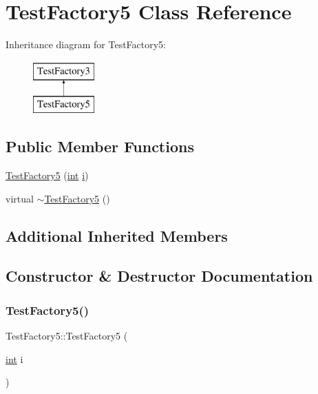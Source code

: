 \hypertarget{class_test_factory5}{}\section{Test\+Factory5 Class Reference}
\label{class_test_factory5}
Inheritance diagram for Test\+Factory5\+:\begin{figure}[H]
\begin{center}
\leavevmode
\includegraphics[height=2.000000cm]{class_test_factory5}
\end{center}
\end{figure}
\subsection*{Public Member Functions}
\begin{DoxyCompactItemize}
\item 
\mbox{\hyperlink{class_test_factory5_a676d14f6bbea3469fa3b9641b6b210b8}{Test\+Factory5}} (\mbox{\hyperlink{warnings_8h_a74f207b5aa4ba51c3a2ad59b219a423b}{int}} \mbox{\hyperlink{abstract_8h_a13235ab5ddf5c2ccd5ca35ab01d91328}{i}})
\item 
virtual \mbox{\hyperlink{class_test_factory5_ade5cfff7b295ef6eb7f9cafabc9c1ff7}{$\sim$\+Test\+Factory5}} ()
\end{DoxyCompactItemize}
\subsection*{Additional Inherited Members}


\subsection{Constructor \& Destructor Documentation}
\mbox{\label{class_test_factory5_a676d14f6bbea3469fa3b9641b6b210b8}} 
\subsubsection{\texorpdfstring{TestFactory5()}{TestFactory5()}}
{\footnotesize\ttfamily Test\+Factory5\+::\+Test\+Factory5 (\begin{DoxyParamCaption}\item[{\mbox{\hyperlink{warnings_8h_a74f207b5aa4ba51c3a2ad59b219a423b}{int}}}]{i }\end{DoxyParamCaption})\hspace{0.3cm}{\ttfamily [inline]}}

